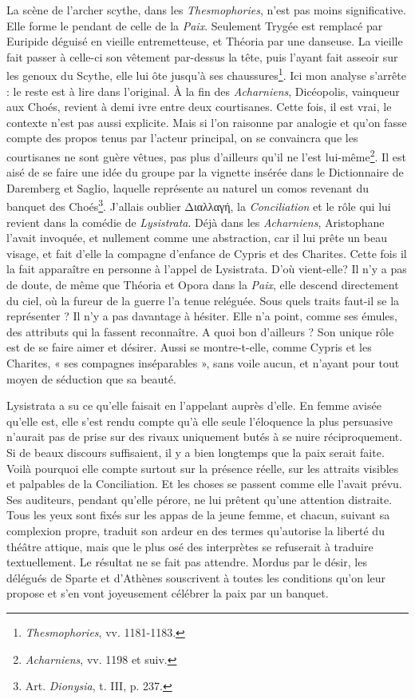 \documentclass{book}%
\newcommand{\italique}[1]{\textit{#1}}%
\newcommand{\note}[1]{\footnote{#1}}
\begin{document}
La scène de l'archer scythe, dans les \italique{Thesmophories}, n'est pas moins significative. Elle forme le pendant de celle de la \italique{Paix}. Seulement Trygée est remplacé par Euripide déguisé en vieille entremetteuse, et Théoria par une danseuse. La vieille fait passer à celle-ci son vêtement par-dessus la tête, puis l'ayant fait asseoir sur les genoux du Scythe, elle lui ôte jusqu'à ses chaussures\note{\italique{Thesmophories}, vv. 1181-1183.}. Ici mon analyse s'arrête : le reste est à lire dans l'original. À la fin des \italique{Acharniens}, Dicéopolis, vainqueur aux Choés, revient à demi ivre entre deux courtisanes. Cette fois, il est vrai, le contexte n'est pas aussi explicite. Mais si l'on raisonne par analogie et qu'on fasse compte des propos tenus par l'acteur principal, on se convaincra que les courtisanes ne sont guère vêtues, pas plus d'ailleurs qu'il ne l'est lui-même\note{\italique{Acharniens}, vv. 1198 et suiv.}. 
Il est aisé de se faire une idée du groupe par la vignette insérée dans le Dictionnaire de Daremberg et Saglio, laquelle représente au naturel un comos revenant du banquet des Choés\note{Art. \italique{Dionysia}, t. III, p. 237.}. 
J'allais oublier Διαλλαγή, la \italique{Conciliation} et le rôle qui lui revient dans la comédie de \italique{Lysistrata}. Déjà dans les \italique{Acharniens}, Aristophane l'avait invoquée, et nullement comme une abstraction, car il lui prête un beau visage, et fait d'elle la compagne d'enfance de Cypris et des Charites. 
Cette fois il la fait apparaître en personne à l'appel de Lysistrata. D'où vient-elle? Il n'y a pas de doute, de même que Théoria et Opora dans la \italique{Paix}, elle descend directement du ciel, où la fureur de la guerre l'a tenue reléguée. 
Sous quels traits faut-il se la représenter ? Il n'y a pas davantage à hésiter. Elle n'a point, comme ses émules, des attributs qui la fassent reconnaître. A quoi bon d'ailleurs ? Son unique rôle est de se faire aimer et désirer. Aussi se montre-t-elle, comme Cypris et les Charites, « ses compagnes inséparables », sans voile aucun, et n'ayant pour tout moyen de séduction que sa beauté. 

Lysistrata a su ce qu'elle faisait en l'appelant auprès d'elle. En femme avisée qu'elle est, elle s'est rendu compte qu'à elle seule l'éloquence la plus persuasive n'aurait pas de prise sur des rivaux uniquement butés à se nuire réciproquement. Si de beaux discours suffisaient, il y a bien longtemps que la paix serait faite. Voilà pourquoi elle compte surtout sur la présence réelle, sur les attraits visibles et palpables de la Conciliation. Et les choses se passent comme elle l'avait prévu. Ses auditeurs, pendant qu'elle pérore, ne lui prêtent qu'une attention distraite. Tous les yeux sont fixés sur les appas de la jeune femme, et chacun, suivant sa complexion propre, traduit son ardeur en des termes qu'autorise la liberté du théâtre attique, mais que le plus osé des interprètes se refuserait à traduire textuellement.
Le résultat ne se fait pas attendre. Mordus par le désir, les délégués de Sparte et d'Athènes souscrivent à toutes les conditions qu'on leur propose et s'en vont joyeusement célébrer la paix par un banquet. 
\end{document}
